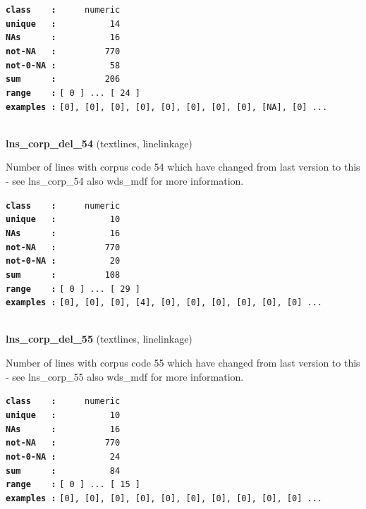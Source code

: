\documentclass[]{article}
\begin{document}
\textbf{\texttt{class\ \ \ \ :}} \texttt{~~~~~numeric}\\
\textbf{\texttt{unique\ \ \ :}} \texttt{~~~~~~~~~~14}\\
\textbf{\texttt{NAs\ \ \ \ \ \ :}} \texttt{~~~~~~~~~~16}\\
\textbf{\texttt{not-NA\ \ \ :}} \texttt{~~~~~~~~~770}\\
\textbf{\texttt{not-0-NA\ :}} \texttt{~~~~~~~~~~58}\\
\textbf{\texttt{sum\ \ \ \ \ \ :}} \texttt{~~~~~~~~~206}\\
\textbf{\texttt{range\ \ \ \ :}}
\texttt{{[}\ 0\ {]}\ ...\ {[}\ 24\ {]}}\\
\textbf{\texttt{examples\ :}}
\texttt{{[}0{]},\ {[}0{]},\ {[}0{]},\ {[}0{]},\ {[}0{]},\ {[}0{]},\ {[}0{]},\ {[}0{]},\ {[}NA{]},\ {[}0{]}\ ...}\\

~

\textbf{lns\_corp\_del\_54} (textlines, linelinkage)

Number of lines with corpus code 54 which have changed from last version
to this - see lns\_corp\_54 also wds\_mdf for more information.

\textbf{\texttt{class\ \ \ \ :}} \texttt{~~~~~numeric}\\
\textbf{\texttt{unique\ \ \ :}} \texttt{~~~~~~~~~~10}\\
\textbf{\texttt{NAs\ \ \ \ \ \ :}} \texttt{~~~~~~~~~~16}\\
\textbf{\texttt{not-NA\ \ \ :}} \texttt{~~~~~~~~~770}\\
\textbf{\texttt{not-0-NA\ :}} \texttt{~~~~~~~~~~20}\\
\textbf{\texttt{sum\ \ \ \ \ \ :}} \texttt{~~~~~~~~~108}\\
\textbf{\texttt{range\ \ \ \ :}}
\texttt{{[}\ 0\ {]}\ ...\ {[}\ 29\ {]}}\\
\textbf{\texttt{examples\ :}}
\texttt{{[}0{]},\ {[}0{]},\ {[}0{]},\ {[}4{]},\ {[}0{]},\ {[}0{]},\ {[}0{]},\ {[}0{]},\ {[}0{]},\ {[}0{]}\ ...}\\

~

\textbf{lns\_corp\_del\_55} (textlines, linelinkage)

Number of lines with corpus code 55 which have changed from last version
to this - see lns\_corp\_55 also wds\_mdf for more information.

\textbf{\texttt{class\ \ \ \ :}} \texttt{~~~~~numeric}\\
\textbf{\texttt{unique\ \ \ :}} \texttt{~~~~~~~~~~10}\\
\textbf{\texttt{NAs\ \ \ \ \ \ :}} \texttt{~~~~~~~~~~16}\\
\textbf{\texttt{not-NA\ \ \ :}} \texttt{~~~~~~~~~770}\\
\textbf{\texttt{not-0-NA\ :}} \texttt{~~~~~~~~~~24}\\
\textbf{\texttt{sum\ \ \ \ \ \ :}} \texttt{~~~~~~~~~~84}\\
\textbf{\texttt{range\ \ \ \ :}}
\texttt{{[}\ 0\ {]}\ ...\ {[}\ 15\ {]}}\\
\textbf{\texttt{examples\ :}}
\texttt{{[}0{]},\ {[}0{]},\ {[}0{]},\ {[}0{]},\ {[}0{]},\ {[}0{]},\ {[}0{]},\ {[}0{]},\ {[}0{]},\ {[}0{]}\ ...}\\
\end{document}
